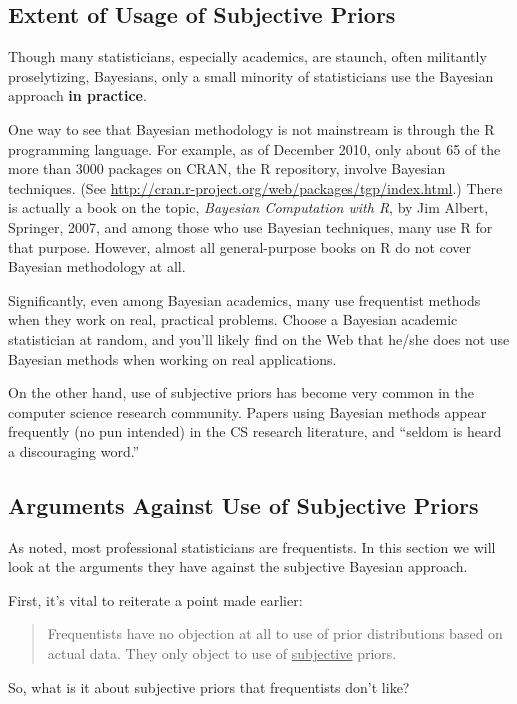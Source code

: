 \subsection{Extent of Usage of Subjective Priors}

Though many statisticians, especially academics, are staunch, often
militantly proselytizing, Bayesians, only a small minority of
statisticians use the Bayesian approach {\bf in practice}.

One way to see that Bayesian methodology is not mainstream is through
the R programming language.  For example, as of December 2010, only
about 65 of the more than 3000 packages on CRAN, the R repository,
involve Bayesian techniques.  (See
\url{http://cran.r-project.org/web/packages/tgp/index.html}.) There is
actually a book on the topic, {\it Bayesian Computation with R}, by Jim
Albert, Springer, 2007, and among those who use Bayesian techniques,
many use R for that purpose.  However, almost all general-purpose books
on R do not cover Bayesian methodology at all.

Significantly, even among Bayesian academics, many use frequentist
methods when they work on real, practical problems.  Choose a Bayesian
academic statistician at random, and you'll likely find on the Web that
he/she does not use Bayesian methods when working on real applications.  

On the other hand, use of subjective priors has become very common in
the computer science research community.  Papers using Bayesian methods
appear frequently (no pun intended) in the CS research literature, and
``seldom is heard a discouraging word.''

\subsection{Arguments Against Use of Subjective Priors}

As noted, most professional statisticians are frequentists.  In this
section we will look at the arguments they have against the subjective
Bayesian approach.

First, it's vital to reiterate a point made earlier:

\begin{quote}
Frequentists have no objection at all to use of prior distributions
based on actual data.  They only object to use of \underline{subjective}
priors.
\end{quote}

So, what is it about subjective priors that frequentists don't like?

